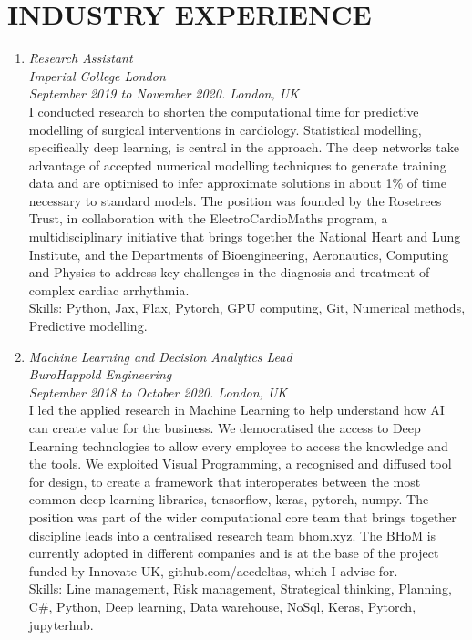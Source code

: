 \section*{INDUSTRY EXPERIENCE}
    \begin{enumerate}[leftmargin=0.45cm, itemsep=1em, topsep=0.5em, parsep=0.2em]
        \item
        \emph{Research Assistant} \\
        \emph{Imperial College London}  \\
        \textit{September 2019 to November 2020. London, UK} \vspace{0.2em} \\
        {I conducted research to shorten the computational time for predictive modelling of surgical interventions in cardiology. Statistical modelling, specifically deep learning, is central in the approach. The deep networks take advantage of accepted numerical modelling techniques to generate training data and are optimised to infer approximate solutions in about 1\% of time necessary to standard models. The position was founded by the Rosetrees Trust, in collaboration with the ElectroCardioMaths program, a multidisciplinary initiative that brings together the National Heart and Lung Institute, and the Departments of Bioengineering, Aeronautics, Computing and Physics to address key challenges in the diagnosis and treatment of complex cardiac arrhythmia.} \\
        Skills: Python, Jax, Flax, Pytorch, GPU computing, Git, Numerical methods, Predictive modelling.

        \item
        \emph{Machine Learning and Decision Analytics Lead} \\
        \emph{BuroHappold Engineering}  \\
        \textit{September 2018 to October 2020. London, UK} \vspace{0.2em} \\
        {I led the applied research in Machine Learning to help understand how AI can create value for the business. We democratised the access to Deep Learning technologies to allow every employee to access the knowledge and the tools. We exploited Visual Programming, a recognised and diffused tool for design, to create a framework that interoperates between the most common deep learning libraries, tensorflow, keras, pytorch, numpy. The position was part of the wider computational core team that brings together discipline leads into a centralised research team bhom.xyz. The BHoM is currently adopted in different companies and is at the base of the project funded by Innovate UK, github.com/aecdeltas, which I advise for.} \\
        Skills: Line management, Risk management, Strategical thinking, Planning, C\#, Python, Deep learning, Data warehouse, NoSql, Keras, Pytorch, jupyterhub.


\end{enumerate}
